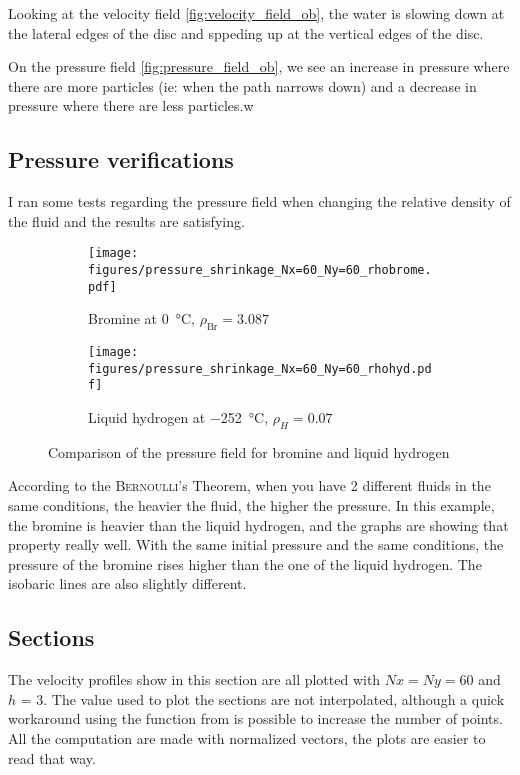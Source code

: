 Looking at the velocity field \autoref{fig:velocity_field_ob}, the water is
slowing down at the lateral edges of the disc and sppeding up at the vertical
edges of the disc.

On the pressure field \autoref{fig:pressure_field_ob}, we see an increase in
pressure where there are more particles (ie: when the path narrows down) and
a decrease in pressure where there are less particles.w

\subsection{Pressure verifications}
I ran some tests regarding the pressure field when changing the relative
density of the fluid and the results are satisfying.

\begin{figure}[htbp]
      \centering
      \begin{subfigure}{.45\textwidth}
            \texttt{[image: figures/pressure\_shrinkage\_Nx=60\_Ny=60\_rhobrome.pdf]}
            \caption{Bromine at \SI{0}{\celsius}, $\rho_{\text{Br}} = 3.087$}\label{fig:pressure_brome}
      \end{subfigure}
      \begin{subfigure}{.45\textwidth}
            \texttt{[image: figures/pressure\_shrinkage\_Nx=60\_Ny=60\_rhohyd.pdf]}
            \caption{Liquid hydrogen at \SI{-252}{\celsius}, $\rho_{H} = 0.07$}\label{fig:pressure_hydrogen}
      \end{subfigure}
      \caption{Comparison of the pressure field for bromine and liquid hydrogen}
      \label{fig:pressure_com}
\end{figure}

According to the \textsc{Bernoulli}'s Theorem, when you have
2 different fluids in the same conditions, the heavier the fluid, the higher
the pressure. In this example, the bromine is heavier than the liquid hydrogen,
and the graphs are showing that property really well. With the same initial
pressure and the same conditions, the pressure of the bromine rises higher than
the one of the liquid hydrogen. The isobaric lines are also slightly
different.

\newpage
\subsection{Sections}\label{sec:section}
The velocity profiles show in this section are all plotted with $Nx = Ny = 60$
and $h$ = 3. The value used to plot the sections are not interpolated, although
a quick workaround using the \textcolor{func}{} function from
 is possible to increase the number of points. All the computation
are made with normalized vectors, the plots are easier to read that way.

